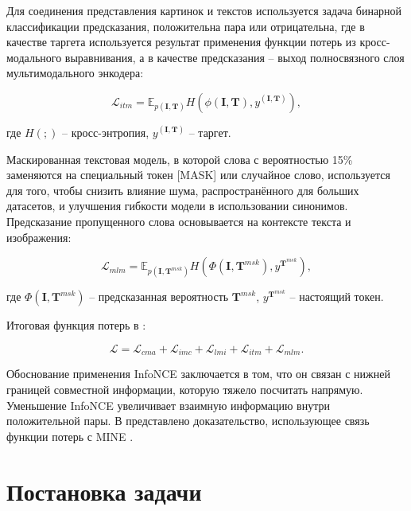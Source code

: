 \documentclass[a4paper, 14pt]{article}
\begin{document}
Для соединения представления картинок и текстов используется задача бинарной классификации предсказания, положительна пара или отрицательна, где в качестве таргета используется результат применения функции потерь из кросс-модального выравнивания, а в качестве предсказания -- выход полносвязного слоя мультимодального энкодера:

\begin{equation}
    \mathcal{L}_{itm} = \mathbb{E}_{p(\mathbf{I}, \mathbf{T})}H(\phi(\mathbf{I}, \mathbf{T}), y^{(\mathbf{I}, \mathbf{T})}),
\end{equation}

\noindent где $H(;)$ -- кросс-энтропия, $y^{(\mathbf{I}, \mathbf{T})}$ -- таргет.

Маскированная текстовая модель, в которой слова с вероятностью 15\% заменяются на специальный токен [MASK] или случайное слово, используется для того, чтобы снизить влияние шума, распространённого для больших датасетов, и улучшения гибкости модели в использовании синонимов. Предсказание пропущенного слова основывается на контексте текста и изображения:

\begin{equation}
    \mathcal{L}_{mlm} = \mathbb{E}_{p(\mathbf{I}, \mathbf{T}^{msk})}H(\Phi(\mathbf{I}, \mathbf{T}^{msk}), y^{\mathbf{T}^{msk}}),
\end{equation}

\noindent где $\Phi(\mathbf{I}, \mathbf{T}^{msk})$ -- предсказанная вероятность $\mathbf{T}^{msk}$, $y^{\mathbf{T}^{msk}}$ -- настоящий токен.

Итоговая функция потерь в \citep{TCL}:

\begin{equation}
    \mathcal{L} = \mathcal{L}_{cma} + \mathcal{L}_{imc} + \mathcal{L}_{lmi} + \mathcal{L}_{itm} + \mathcal{L}_{mlm}.
\end{equation}

Обоснование применения InfoNCE заключается в том, что он связан с нижней границей совместной информации, которую тяжело посчитать напрямую. Уменьшение InfoNCE увеличивает взаимную информацию внутри положительной пары. В \citep{Oord2018RepresentationLW} представлено доказательство, использующее связь функции потерь с MINE \citep{belghazi2021mine}.

\newpage
\section{Постановка задачи}
\end{document}

